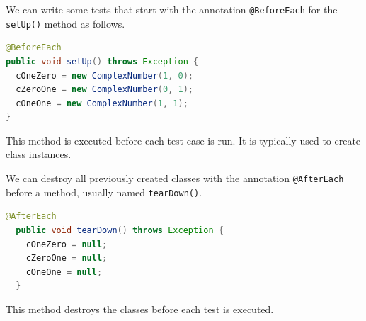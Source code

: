 \documentclass[11pt, xcolor=svgnames]{beamer}
\begin{document}
 


%

\begin{frame}[fragile]

We can write some tests that start with the annotation \texttt{@BeforeEach} for the \texttt{setUp()} method as follows.

\begin{lstlisting}[language=Java,basicstyle=\tiny]
@BeforeEach
public void setUp() throws Exception {
  cOneZero = new ComplexNumber(1, 0);
  cZeroOne = new ComplexNumber(0, 1);
  cOneOne = new ComplexNumber(1, 1);
}
\end{lstlisting}

This method is executed before each test case is run. It is typically used to create class instances.

\end{frame}


\begin{frame}[fragile]

  We can destroy all previously created classes with the annotation \texttt{@AfterEach} before a method, usually named \texttt{tearDown()}.
  
  \begin{lstlisting}[language=Java,basicstyle=\tiny]
  @AfterEach
  public void tearDown() throws Exception {
    cOneZero = null;
    cZeroOne = null;
    cOneOne = null;
  }
  \end{lstlisting}
  
  This method destroys the classes before each test is executed.
  
  \end{frame}
\end{document}
